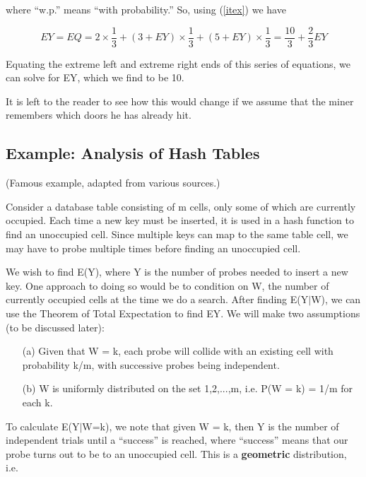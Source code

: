 where ``w.p.'' means ``with probability.'' So, using (\ref{itex}) we have

\begin{equation}
EY=EQ=2\times \frac{1}{3}+(3+EY)\times \frac{1}{3}+(5+EY)\times \frac{1}{3}=\frac{10}{3}+\frac{2}{3}EY
\end{equation}

Equating the extreme left and extreme right ends of this series of equations,
we can solve for EY, which we find to be 10.


It is left to the reader to see how this would change if we assume that the
miner remembers which doors he has already hit.

\subsection{Example:  Analysis of Hash Tables}

(Famous example, adapted from various sources.)

Consider a database table consisting of m cells, only some of which are
currently occupied. Each time a new key must be inserted, it is used in
a hash function to find an unoccupied cell. Since multiple keys can map to
the same table cell, we may have to probe multiple times before finding
an unoccupied cell.

We wish to find E(Y), where Y is the number of probes needed to insert a
new key.  One approach to doing so would be to condition on W, the
number of currently occupied cells at the time we do a search.  After
finding E(Y$|$W), we can use the Theorem of Total Expectation to find
EY.  We will make two assumptions (to be discussed later):

\begin{itemize}

\item [(a)] Given that W = k, each probe will collide with an existing
cell with probability k/m, with successive probes being independent.

\item [(b)] W is uniformly distributed on the set 1,2,...,m, i.e. P(W =
k) = 1/m for each k.

\end{itemize}

To calculate E(Y$|$W=k), we note that given W = k, then Y is the
number of independent trials until a ``success'' is reached, where
``success'' means that our probe turns out to be to an unoccupied cell.
This is a {\bf geometric} distribution, i.e.

